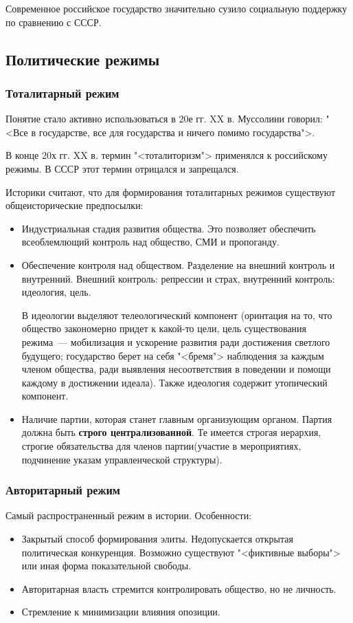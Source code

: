Современное российское государство значительно сузило социальную поддержку по сравнению с СССР.

\subsection{Политические режимы}
\subsubsection{Тоталитарный режим}
Понятие стало активно использоваться в 20е гг. XX в. Муссолини говорил: "<Все в государстве, все для государства и ничего помимо государства">.

В конце 20х гг. XX в. термин "<тоталиторизм"> применялся к российскому режимы. В СССР этот термин отрицался и запрещался.

Историки считают, что для формирования тоталитарных режимов существуют общеисторические предпосылки:
\begin{itemize}
	\item Индустриальная стадия развития общества. Это позволяет обеспечить всеоблемлющий контроль над общество, СМИ и пропоганду.
	\item Обеспечение контроля над обществом. Разделение на внешний контроль и внутренний. Внешний контроль: репрессии и страх, внутренний контроль: идеология, цель.
	
	В идеологии выделяют телеологический компонент (оринтация на то, что общество закономерно придет к какой-то цели, цель существования режима~--- мобилизация и ускорение развития ради достижения светлого будущего; государство берет на себя "<бремя"> наблюдения за каждым членом общества, ради выявления несоответствия в поведении и помощи каждому в достижении идеала). Также идеология содержит утопический компонент.
	\item Наличие партии, которая станет главным организующим органом. Партия должна быть \textbf{строго централизованной}. Те имеется строгая иерархия, строгие обязательства для членов партии(участие в мероприятиях, подчинение указам управленческой структуры).
\end{itemize}

\subsubsection{Авторитарный режим}
Самый распространенный режим в истории. Особенности:
\begin{itemize}
	\item Закрытый способ формирования элиты. Недопускается открытая политическая конкуренция. Возможно существуют "<фиктивные выборы"> или иная форма показательной свободы.
	\item Авторитарная власть стремится контролировать общество, но не личность.
	\item Стремление к минимизации влияния опозиции.
\end{itemize}

